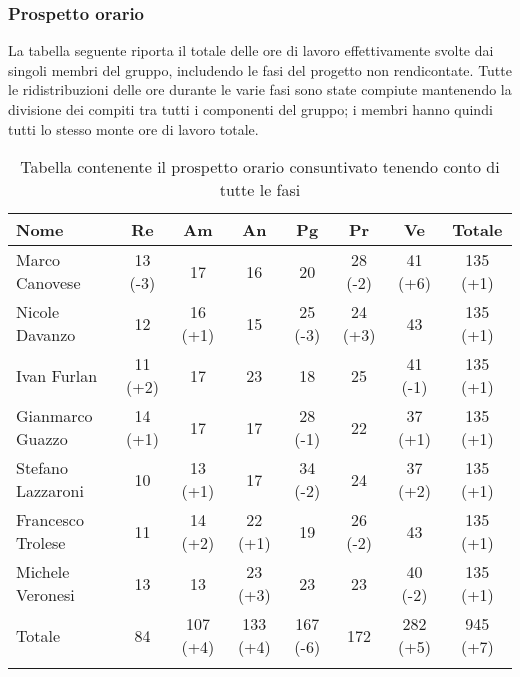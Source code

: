\subsubsection{Prospetto orario}
La tabella seguente riporta il totale delle ore di lavoro effettivamente svolte dai singoli membri del gruppo, includendo le fasi del progetto non rendicontate. Tutte le ridistribuzioni delle ore durante le varie fasi sono state compiute mantenendo la divisione dei compiti tra tutti i componenti del gruppo; i membri hanno quindi tutti lo stesso monte ore di lavoro totale.

\begin{longtable}{|l|c|c|c|c|c|c|c|}
	\hline
	\rowcolor{lighter-grayer}
	\textbf{Nome}     & \textbf{Re} & \textbf{Am} & \textbf{An} & \textbf{Pg} & \textbf{Pr} & \textbf{Ve} & \textbf{Totale} \\
	\hline
	\endfirsthead

	\hline
	Marco Canovese    & 13 (-3)         & 17          & 16          & 20          & 28 (-2)         & 41 (+6)         & 135 (+1)            \\
	\hline
	\hline
	Nicole Davanzo    & 12          & 16 (+1)         & 15          & 25 (-3)          & 24 (+3)         & 43          & 135 (+1)            \\
	\hline
	\hline
	Ivan Furlan       & 11 (+2)         & 17          & 23          & 18          & 25          & 41 (-1)         & 135 (+1)            \\
	\hline
	\hline
	Gianmarco Guazzo  & 14 (+1)         & 17          & 17          & 28 (-1)         & 22          & 37 (+1)         & 135 (+1)            \\
	\hline
	\hline
	Stefano Lazzaroni & 10         & 13 (+1)         & 17          & 34 (-2)         & 24          & 37 (+2)         & 135 (+1)            \\
	\hline
	\hline
	Francesco Trolese & 11          & 14 (+2)         & 22 (+1)         & 19          & 26 (-2)         & 43          & 135 (+1)            \\
	\hline
	\hline
	Michele Veronesi  & 13          & 13          & 23 (+3)         & 23          & 23          & 40 (-2)         & 135 (+1)            \\
	\hline
	\hline
	Totale            & 84          & 107 (+4)        & 133 (+4)        & 167 (-6)        & 172        & 282 (+5)         & 945 (+7)            \\
	\hline
	\rowcolor{white}
	\caption{Tabella contenente il prospetto orario consuntivato tenendo conto di tutte le fasi}
\end{longtable}

